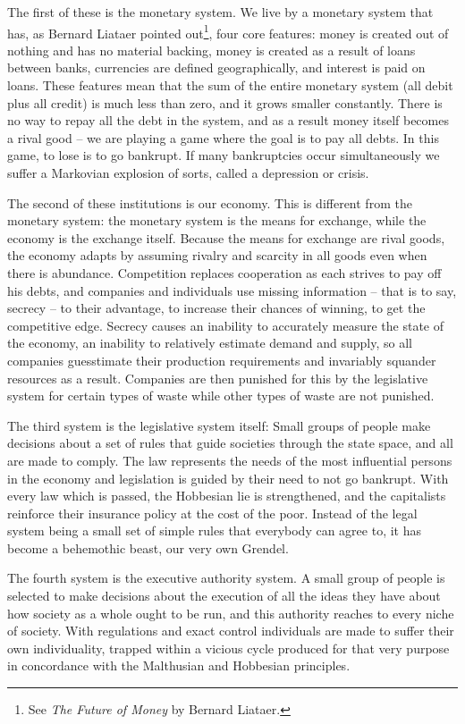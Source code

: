 The f\hbox{}irst of these is the monetary system. We live by a monetary system
that has, as Bernard Liataer pointed out\footnote{See \textit{The Future of
Money} by Bernard Liataer.}, four core features: money is created out of 
nothing and has no material backing, money is created as a result of loans
between banks, currencies are def\hbox{}ined geographically, and interest is
paid on loans. These features mean that the sum of the entire monetary system
(all debit plus all credit) is much less than zero, and it grows smaller
constantly. There is no way to repay all the debt in the system, and as a 
result money itself becomes a rival good – we are playing a game where the goal
is to pay all debts.  In this game, to lose is to go bankrupt. If many
bankruptcies occur simultaneously we suf\hbox{}fer a Markovian explosion of
sorts, called a depression or crisis.

The second of these institutions is our economy. This is dif\hbox{}ferent from
the monetary system: the monetary system is the means for exchange, while the
economy is the exchange itself. Because the means for exchange are rival goods,
the economy adapts by assuming rivalry and scarcity in all goods even when 
there is abundance. Competition replaces cooperation as each strives to pay
of\hbox{}f his debts, and companies and individuals use missing information –
that is to say, secrecy – to their advantage, to increase their chances of
winning, to get the competitive edge. Secrecy causes an inability to accurately
measure the state of the economy, an inability to relatively estimate demand 
and supply, so all companies guesstimate their production requirements and
invariably squander resources as a result. Companies are then punished for this
by the legislative system for certain types of waste while other types of waste
are not punished.

The third system is the legislative system itself: Small groups of people make
decisions about a set of rules that guide societies through the state space, 
and all are made to comply. The law represents the needs of the most
inf\hbox{}luential persons in the economy and legislation is guided by their
need to not go bankrupt. With every law which is passed, the Hobbesian lie is
strengthened, and the capitalists reinforce their insurance policy at the cost
of the poor.  Instead of the legal system being a small set of simple rules 
that everybody can agree to, it has become a behemothic beast, our very own
Grendel.

The fourth system is the executive authority system. A small group of people is
selected to make decisions about the execution of all the ideas they have about
how society as a whole ought to be run, and this authority reaches to every
niche of society. With regulations and exact control individuals are made to
suf\hbox{}fer their own individuality, trapped within a vicious cycle produced
for that very purpose in concordance with the Malthusian and Hobbesian
principles.

